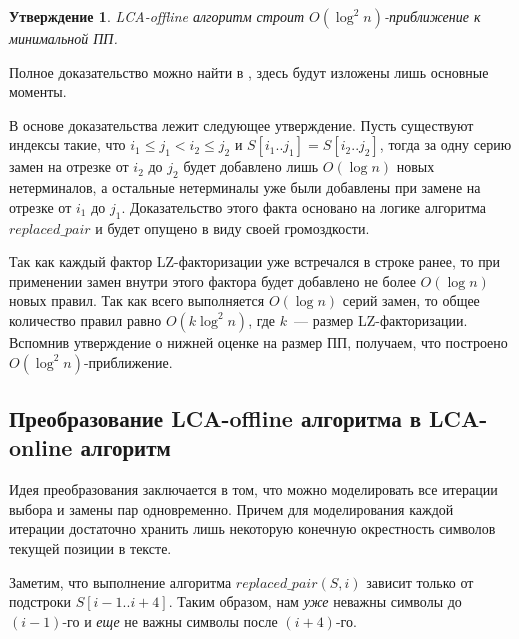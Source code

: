 \documentclass[14pt]{article}
\newtheorem{lemma}{Лемма}[section]
\newtheorem{claim}{Утверждение}[section]
\begin{document}



\begin{claim}
	LCA-offline алгоритм строит $O(\log^2 n)$-приближение к минимальной ПП.
\end{claim}

Полное доказательство можно найти в \cite{LCAOnlineSLP}, здесь будут изложены лишь основные моменты.

В основе доказательства лежит следующее утверждение. Пусть существуют индексы такие, что
$i_1 \leq j_1 < i_2 \leq j_2$ и $S[i_1..j_1] = S[i_2..j_2]$, тогда
за одну серию замен на отрезке от $i_2$ до $j_2$ будет добавлено лишь $O(\log n)$ новых нетерминалов, а остальные нетерминалы
уже были добавлены при замене на отрезке от $i_1$ до $j_1$. Доказательство этого факта основано на логике алгоритма $replaced\_pair$
и будет опущено в виду своей громоздкости.

Так как каждый фактор LZ-факторизации уже встречался в строке ранее, то при применении замен внутри этого фактора будет добавлено
не более $O(\log n)$ новых правил. Так как всего выполняется $O(\log n)$ серий замен, то общее количество правил равно $O(k\log^2 n)$,
где $k$~--- размер LZ-факторизации. Вспомнив утверждение о нижней оценке на размер ПП, получаем, что построено $O(\log^2 n)$-приближение.

\subsection{Преобразование LCA-offline алгоритма в LCA-online алгоритм}

Идея преобразования заключается в том, что можно моделировать все итерации выбора и замены пар одновременно.
Причем для моделирования каждой итерации достаточно хранить лишь некоторую конечную окрестность символов текущей позиции в тексте.

Заметим, что выполнение алгоритма $replaced\_pair(S, i)$ зависит только от подстроки $S[i-1..i+4]$. Таким образом,
нам {\it уже} неважны символы до $(i-1)$-го и {\it еще} не важны символы после $(i+4)$-го.
\end{document}
